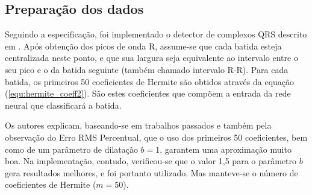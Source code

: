\subsection{Preparação dos dados}
Seguindo a especificação, foi implementado o detector de complexos QRS descrito em \cite{Tompkins85}. Após obtenção dos picos de onda R, assume-se que cada batida esteja centralizada neste ponto, e que sua largura seja equivalente ao intervalo entre o seu pico e o da batida seguinte (também chamado intervalo R-R). Para cada batida, os primeiros 50 coeficientes de Hermite são obtidos através da equação (\ref{equ:hermite_coeff2}). São estes coeficientes que compõem a entrada da rede neural que classificará a batida.

Os autores explicam, baseando-se em trabalhos passados e também pela observação do Erro RMS Percentual, que o uso dos primeiros 50 coeficientes, bem como de um parâmetro de dilatação $b=1$, garantem uma aproximação muito boa. Na implementação, contudo, verificou-se que o valor 1,5 para o parâmetro $b$ gera resultados melhores, e foi portanto utilizado. Mas  manteve-se o número de coeficientes de Hermite ($m=50$).
